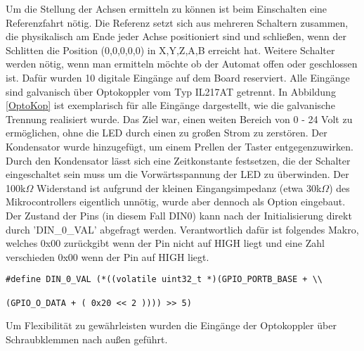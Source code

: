 \documentclass{scrartcl}
\begin{document}
Um die Stellung der Achsen ermitteln zu können ist beim Einschalten eine Referenzfahrt nötig. Die Referenz setzt sich aus mehreren Schaltern zusammen, die physikalisch am Ende jeder Achse positioniert sind und schließen, wenn der Schlitten die Position (0,0,0,0,0) in X,Y,Z,A,B erreicht hat. Weitere Schalter werden nötig, wenn man ermitteln möchte ob der Automat offen oder geschlossen ist. Dafür wurden 10 digitale Eingänge auf dem Board reserviert. Alle Eingänge sind galvanisch über Optokoppler vom Typ IL217AT getrennt. In Abbildung \ref{OptoKop} ist exemplarisch für alle Eingänge dargestellt, wie die galvanische Trennung realisiert wurde. Das Ziel war, einen weiten Bereich von 0 - 24 Volt zu ermöglichen, ohne die LED durch einen zu großen Strom zu zerstören. Der Kondensator wurde hinzugefügt, um einem Prellen der Taster entgegenzuwirken. Durch den Kondensator lässt sich eine Zeitkonstante festsetzen, die der Schalter eingeschaltet sein muss um die Vorwärtsspannung der LED zu überwinden. Der 100k$\Omega$ Widerstand ist aufgrund der kleinen Eingangsimpedanz (etwa 30k$\Omega$) des Mikrocontrollers eigentlich unnötig, wurde aber dennoch als Option eingebaut. Der Zustand der Pins (in diesem Fall DIN0) kann nach der Initialisierung direkt durch 'DIN\_0\_VAL' abgefragt werden. Verantwortlich dafür ist folgendes Makro, welches 0x00 zurückgibt wenn der Pin nicht auf HIGH liegt und eine Zahl verschieden 0x00 wenn der Pin auf HIGH liegt.
\begin{verbatim}
#define DIN_0_VAL (*((volatile uint32_t *)(GPIO_PORTB_BASE + \\

(GPIO_O_DATA + ( 0x20 << 2 )))) >> 5)
\end{verbatim} 
Um Flexibilität zu gewährleisten wurden die Eingänge der Optokoppler über Schraubklemmen nach außen geführt.
 
\end{document}
